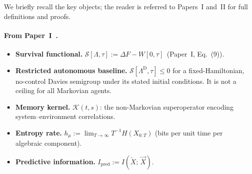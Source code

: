 \documentclass[12pt,a4paper,openany]{book}
\begin{document}
We briefly recall the key objects; the reader is referred to
Papers~I and~II for full definitions and proofs.

\paragraph{From Paper~I~\cite{Liu2026TDOME_I}.}
\begin{itemize}
\item \textbf{Survival functional.}
  $\mathcal{S}[\Lambda,\tau]
  := \Delta F - W[0,\tau]$~(Paper~I,
  Eq.~(9)).
\item \textbf{Restricted autonomous baseline.}
  $\mathcal{S}[\Lambda^{\mathrm{D}},\tau]\leq0$ for a fixed-Hamiltonian,
  no-control Davies semigroup under its stated initial conditions.  It
  is not a ceiling for all Markovian agents.
\item \textbf{Memory kernel.}
  $\mathcal{K}(t,s)$: the non-Markovian superoperator
  encoding system--environment correlations.
\item \textbf{Entropy rate.}
  $h_\mu := \lim_{T\to\infty}T^{-1}H(X_{0:T})$ (bits per
  unit time per algebraic component).
\item \textbf{Predictive information.}
  $I_{\mathrm{pred}}
  := I(\overleftarrow{X};\,\overrightarrow{X})$.
\end{itemize}
\end{document}

